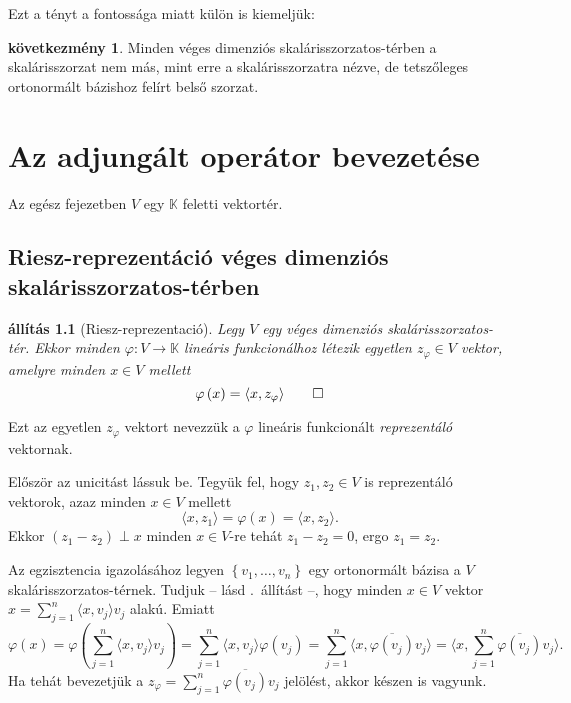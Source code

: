 \documentclass[9pt, a4paper, showtrims]{memoir}
\makeatletter
\renewenvironment{proof}[1][\proofname]
    {\par\pushQED{\qed}%
    \normalfont \topsep6\p@\@plus6\p@\relax
    \trivlist
    \item[\hskip\labelsep
        \itshape
    #1\@addpunct{:}]\ignorespaces}
    {\popQED\endtrivlist\@endpefalse}
\theoremstyle{plain}
\newtheorem{proposition}{állítás}[chapter]
\theoremstyle{remark}
\theoremstyle{definition}
\newtheorem{corollary}[proposition]{következmény}
\newcommand{\ip}[2]{\langle#1,#2\rangle}
\makeatother
\begin{document}
Ezt a tényt a fontossága miatt külön is kiemeljük:
\begin{corollary}
    Minden véges dimenziós skalárisszorzatos-térben a skalárisszorzat nem más, 
    mint erre a skalárisszorzatra nézve, 
    de tetszőleges ortonormált bázishoz felírt belső szorzat.
\end{corollary}

\chapter{Az adjungált operátor bevezetése}
Az egész fejezetben $V$ egy $\mathbb{K}$ feletti vektortér.
\section{Riesz-reprezentáció véges dimenziós skalárisszorzatos-térben}
\begin{proposition}[Riesz-reprezentació]\label{pr:Riesz}
    Legy $V$ egy véges dimenziós skalárisszorzatos-tér.
    Ekkor minden $\varphi:V\to\mathbb{K}$ lineáris funkcionálhoz létezik egyetlen $z_\varphi\in V$ vektor,
    amelyre minden $x\in V$ mellett
    \[
        \varphi\left( x \right)=\ip{x}{z_\varphi}
        \qedhere
    \]
\end{proposition}
Ezt az egyetlen $z_\varphi$ vektort nevezzük a $\varphi$ lineáris funkcionált \emph{reprezentáló} vektornak.
\begin{proof}
    Először az unicitást lássuk be. 
    Tegyük fel, hogy $z_1,z_2\in V$ is reprezentáló vektorok, 
    azaz minden $x\in V$ mellett
    \[
        \ip{x}{z_1}
        =
        \varphi\left( x \right)
        =
        \ip{x}{z_2}.
    \]
    Ekkor $(z_1-z_2)\perp x$ minden $x\in V$-re tehát $z_1-z_2=0$,
    ergo $z_1=z_2$.

    Az egzisztencia igazolásához legyen $\left\{ v_1,\dots,v_n \right\}$ egy ortonormált bázisa a $V$ skalárisszorzatos-térnek.
    Tudjuk -- lásd .~állítást --, hogy minden $x\in V$ vektor 
    \begin{math}
        x=
        \sum_{j=1}^n\ip{x}{v_j}v_j
    \end{math}
    alakú.
    Emiatt
    \[
        \varphi\left( x \right)
        =
        \varphi\left( 
        \sum_{j=1}^n\ip{x}{v_j}v_j
        \right)
        =
        \sum_{j=1}^n
        \ip{x}{v_j}
        \varphi\left( 
        v_j
        \right)
        =
        \sum_{j=1}^n
        \ip{x}{\overline{\varphi\left( 
            v_j\right)}
        v_j}
        =
        \ip{x}{
        \sum_{j=1}^n
            \overline{\varphi\left( 
            v_j\right)}
        v_j}.
    \]
    Ha tehát bevezetjük a 
    \begin{math}
        z_\varphi
        =
        \sum_{j=1}^n
            \overline{\varphi\left( 
            v_j\right)}v_j
    \end{math}
    jelölést, akkor készen is vagyunk.
\end{proof}
\end{document}
